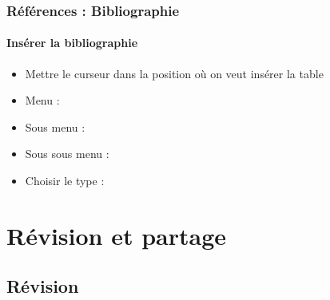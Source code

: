 \documentclass[xcolor=table]{beamer}
\begin{document}
\begin{frame}[t]
\frametitle{Références : Bibliographie}
\framesubtitle{Insérer la bibliographie}

\begin{itemize}
	\item Mettre le curseur dans la position où on veut insérer la table
	\item Menu : 
	\item Sous menu : 
\end{itemize}
\begin{minipage}{0.39\textwidth}
	\begin{itemize}
		\item Sous sous menu : 
		\item Choisir le type : 
	\end{itemize}
\end{minipage}
\begin{minipage}{0.60\textwidth}
\end{minipage}

\end{frame}

\section{Révision et partage}

%

\subsection{Révision}
\end{document}

